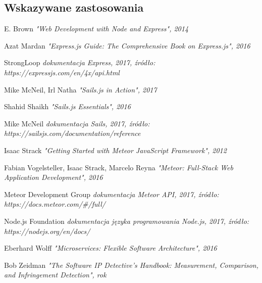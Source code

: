 \documentclass[12pt]{report}
\begin{document}
  \subsection{Wskazywane zastosowania}

\begin{thebibliography}{99}
  E. Brown
  \textit{"Web Development with Node and Express", 2014}

  Azat Mardan
  \textit{"Express.js Guide: The Comprehensive Book on Express.js", 2016}

  StrongLoop
  \textit{dokumentacja Express, 2017, źródło: https://expressjs.com/en/4x/api.html}

  Mike McNeil, Irl Natha
  \textit{"Sails.js in Action", 2017}

  Shahid Shaikh
  \textit{"Sails.js Essentials", 2016}

  Mike McNeil
  \textit{dokumentacja Sails, 2017, źródło: https://sailsjs.com/documentation/reference}

  Isaac Strack
  \textit{"Getting Started with Meteor JavaScript Framework", 2012}

  Fabian Vogelsteller, Isaac Strack, Marcelo Reyna
  \textit{"Meteor: Full-Stack Web Application Development", 2016}

  Meteor Development Group
  \textit{dokumentacja Meteor API, 2017, źródło: https://docs.meteor.com/\#/full/}

  Node.js Foundation
  \textit{dokumentacja języka programowania Node.js, 2017, źródło: https://nodejs.org/en/docs/}

  Eberhard Wolff
  \textit{"Microservices: Flexible Software Architecture", 2016}

  Bob Zeidman
  \textit{"The Software IP Detective's Handbook: Measurement, Comparison, and Infringement Detection", rok}

\end{thebibliography}

\listoffigures
\end{document}
